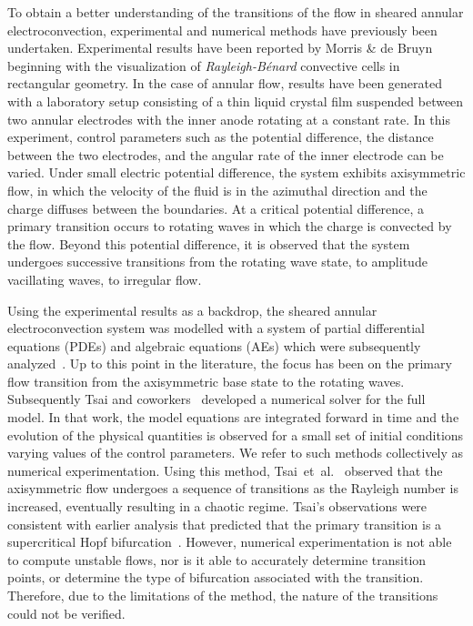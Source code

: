 To obtain a better understanding of the transitions of the flow in sheared annular electroconvection, experimental and numerical methods have previously been undertaken.
Experimental results have been reported by Morris \& de Bruyn~\cite{mao1995,morris1992,experi_elec} beginning with the visualization of \emph{Rayleigh-B\'enard} convective cells in rectangular geometry. In the case of annular flow, results have been generated with a laboratory setup consisting of a thin liquid crystal film suspended between two annular electrodes with the inner anode rotating at a constant rate. In this experiment, control parameters such as the potential difference, the distance between the two electrodes, and the angular rate of the inner electrode can be varied. Under small electric potential difference, the system exhibits axisymmetric flow, in which the velocity of the fluid is in the azimuthal direction and the charge diffuses between the boundaries. At a critical potential difference, a primary transition occurs to rotating waves in which the charge is convected by the flow. Beyond this potential difference, it is observed that the system  undergoes successive transitions from the rotating wave state, to amplitude vacillating waves, to irregular flow.


Using the experimental results as a backdrop, the sheared annular electroconvection system was modelled with a system of partial differential equations (PDEs) and algebraic equations (AEs) which were subsequently analyzed~\cite{EDCTAFUCF,BAEWIS,AEWSDaDe,linearstability,WNAEISFF,Annular}.
Up to this point in the literature, the focus has been on the primary flow transition from the axisymmetric base state to the rotating waves.
Subsequently Tsai and coworkers~\cite{PeiChunTsain,DNSSAE,tsai2004aspect,LSSE-PeDa} developed a numerical solver for the full model. In that work, the model equations are  integrated forward in time and the evolution of the physical quantities is observed for a small set of initial conditions varying values of the control parameters. We refer to such methods collectively as numerical experimentation.  Using this method, Tsai~et~al.~\cite{PeiChunTsain,DNSSAE} observed that the axisymmetric flow undergoes a sequence of transitions as the Rayleigh number is increased, eventually resulting in a chaotic regime. Tsai's observations were consistent with earlier analysis that predicted that the primary transition is a supercritical Hopf bifurcation~\cite{linearstability}. However, numerical experimentation is not able to compute unstable flows, nor is it able to accurately determine transition points, or determine the type of bifurcation associated with the transition. Therefore, due to the limitations of the method, the nature of the transitions could not be verified.

